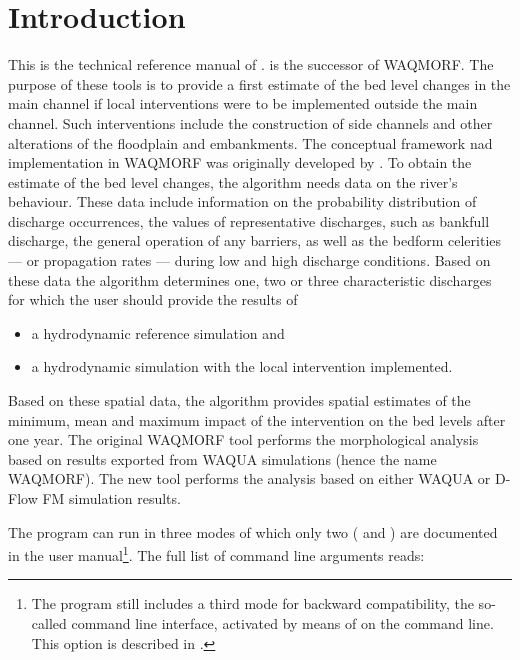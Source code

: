 \chapter{Introduction}

This is the technical reference manual of \dfastmi.
\dfastmi is the successor of WAQMORF.
The purpose of these tools is to provide a first estimate of the bed level changes in the main channel if local interventions were to be implemented outside the main channel.
Such interventions include the construction of side channels and other alterations of the floodplain and embankments.
The conceptual framework nad implementation in WAQMORF was originally developed by \citep{Sieben2008}.
To obtain the estimate of the bed level changes, the algorithm needs data on the river's behaviour.
These data include information on the probability distribution of discharge occurrences, the values of representative discharges, such as bankfull discharge, the general operation of any barriers, as well as the bedform celerities --- or propagation rates --- during low and high discharge conditions.
Based on these data the algorithm determines one, two or three characteristic discharges for which the user should provide the results of

\begin{itemize}
\item a hydrodynamic reference simulation and
\item a hydrodynamic simulation with the local intervention implemented.
\end{itemize}

Based on these spatial data, the algorithm provides spatial estimates of the minimum, mean and maximum impact of the intervention on the bed levels after one year.
The original WAQMORF tool performs the morphological analysis based on results exported from WAQUA simulations (hence the name WAQMORF).
The new \dfastmi tool performs the analysis based on either WAQUA or D-Flow FM simulation results.

The program can run in three modes of which only two ( and ) are documented in the user manual\footnote{\label{fn:backward1}The program still includes a third mode for backward compatibility, the so-called command line interface, activated by means of  on the command line.
This option is described in .}.
The full list of command line arguments reads:

